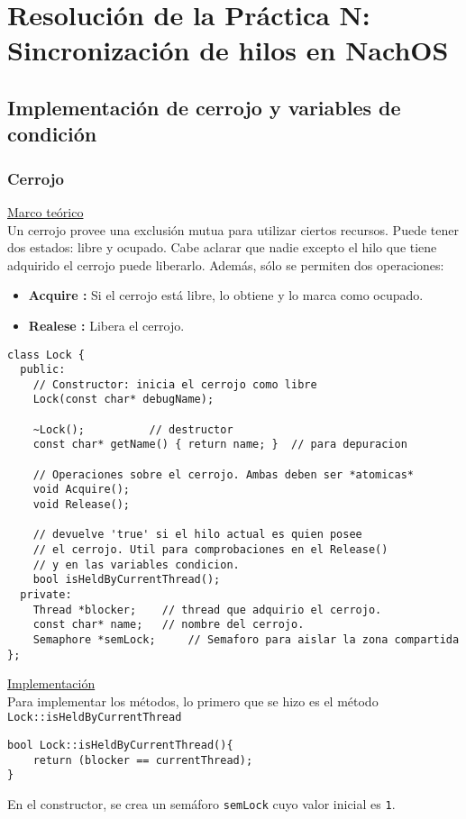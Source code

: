 \chapter{Resolución de la Práctica N: Sincronización de hilos en NachOS}
\section{Implementación de cerrojo y variables de condición}
\subsection*{Cerrojo}
\textsf{\underline{Marco teórico}}\\
Un cerrojo provee una exclusión mutua para utilizar ciertos recursos. Puede tener dos estados: libre y ocupado. Cabe aclarar que nadie excepto el hilo que tiene adquirido el cerrojo puede liberarlo. Además, sólo se permiten dos operaciones:
\begin{itemize}
	\item \textbf{Acquire :} Si el cerrojo está libre, lo obtiene y lo marca como ocupado.
	\item \textbf{Realese :} Libera el cerrojo.
\end{itemize}
\begin{lstlisting}[style=C]
class Lock {
  public:
	// Constructor: inicia el cerrojo como libre
  	Lock(const char* debugName);

  	~Lock();          // destructor
  	const char* getName() { return name; }	// para depuracion

  	// Operaciones sobre el cerrojo. Ambas deben ser *atomicas*
  	void Acquire(); 
  	void Release();

  	// devuelve 'true' si el hilo actual es quien posee
  	// el cerrojo. Util para comprobaciones en el Release()
  	// y en las variables condicion.
  	bool isHeldByCurrentThread();
  private:
    Thread *blocker; 	// thread que adquirio el cerrojo.
    const char* name;	// nombre del cerrojo.
    Semaphore *semLock;     // Semaforo para aislar la zona compartida
};
\end{lstlisting}
\textsf{\underline{Implementación}}\\
Para implementar los métodos, lo primero que se hizo es el método \texttt{Lock::isHeldByCurrentThread}
\begin{lstlisting}[style=C]
bool Lock::isHeldByCurrentThread(){
    return (blocker == currentThread);
}
\end{lstlisting}
En el constructor, se crea un semáforo \texttt{semLock} cuyo valor inicial es \texttt{1}.\\
